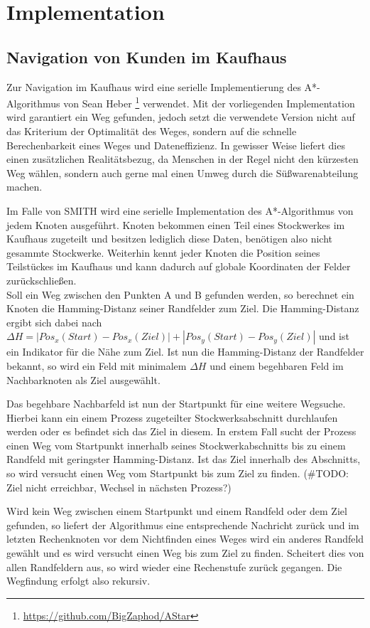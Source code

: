 \section{Implementation}

\subsection{Navigation von Kunden im Kaufhaus}
\label{kundne:nav}
Zur Navigation im Kaufhaus wird eine serielle Implementierung des A*-Algorithmus von Sean Heber \footnote{\url{https://github.com/BigZaphod/AStar}} verwendet.
Mit der vorliegenden Implementation wird garantiert ein Weg gefunden, jedoch setzt die verwendete Version nicht auf das Kriterium der Optimalität des Weges, sondern auf die schnelle Berechenbarkeit eines Weges und Dateneffizienz. In gewisser Weise liefert dies einen zusätzlichen Realitätsbezug, da Menschen in der Regel nicht den kürzesten Weg wählen, sondern auch gerne mal einen Umweg durch die Süßwarenabteilung machen.

Im Falle von SMITH wird eine serielle Implementation des A*-Algorithmus von jedem Knoten ausgeführt. Knoten bekommen einen Teil eines Stockwerkes im Kaufhaus zugeteilt und besitzen lediglich diese Daten, benötigen also nicht gesammte Stockwerke. Weiterhin kennt jeder Knoten die Position seines Teilstückes im Kaufhaus und kann dadurch auf globale Koordinaten der Felder zurückschließen.\\
Soll ein Weg zwischen den Punkten A und B gefunden werden, so berechnet ein Knoten die Hamming-Distanz seiner Randfelder zum Ziel. Die Hamming-Distanz ergibt sich dabei nach $\Delta H = |Pos_x(Start)-Pos_x(Ziel)| + |Pos_y(Start)-Pos_y(Ziel)|$ und ist ein Indikator für die Nähe zum Ziel.
Ist nun die Hamming-Distanz der Randfelder bekannt, so wird ein Feld mit minimalem $\Delta H$ und einem begehbaren Feld im Nachbarknoten als Ziel ausgewählt.

Das begehbare Nachbarfeld ist nun der Startpunkt für eine weitere Wegsuche. Hierbei kann ein einem Prozess zugeteilter Stockwerksabschnitt durchlaufen werden oder es befindet sich das Ziel in diesem. In erstem Fall sucht der Prozess einen Weg vom Startpunkt innerhalb seines Stockwerkabschnitts bis zu einem Randfeld mit geringster Hamming-Distanz. Ist das Ziel innerhalb des Abschnitts, so wird versucht einen Weg vom Startpunkt bis zum Ziel zu finden. (\#TODO: Ziel nicht erreichbar, Wechsel in nächsten Prozess?)

Wird kein Weg zwischen einem Startpunkt und einem Randfeld oder dem Ziel gefunden, so liefert der Algorithmus eine entsprechende Nachricht zurück und im letzten Rechenknoten vor dem Nichtfinden eines Weges wird ein anderes Randfeld gewählt und es wird versucht einen Weg bis zum Ziel zu finden. Scheitert dies von allen Randfeldern aus, so wird wieder eine Rechenstufe zurück gegangen. Die Wegfindung erfolgt also rekursiv.

